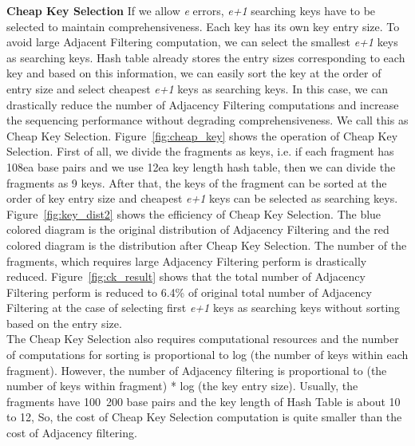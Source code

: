 \textbf{Cheap Key Selection} If we allow \textit{e} errors, \textit{e+1}
searching keys have to be selected to maintain comprehensiveness. Each key has
its own key entry size. To avoid large Adjacent Filtering computation, we can
select the smallest \textit{e+1} keys as searching keys. Hash table already
stores the entry sizes corresponding to each key and based on this information,
we can easily sort the key at the order of entry size and select cheapest
\textit{e+1} keys as searching keys. In this case, we can drastically reduce
the number of Adjacency Filtering computations and increase the sequencing
performance without degrading comprehensiveness. We call this as Cheap Key
Selection. Figure~\ref{fig:cheap_key} shows the operation of Cheap Key
Selection.  First of all, we divide the fragments as keys, i.e. if each
fragment has 108ea base pairs and we use 12ea key length hash table, then we
can divide the fragments as 9 keys. After that, the keys of the fragment can be
sorted at the order of key entry size and cheapest \textit{e+1} keys can be
selected as searching keys. Figure~\ref{fig:key_dist2} shows the efficiency of
Cheap Key Selection. The blue colored diagram is the original distribution of
Adjacency Filtering and the red colored diagram is the distribution after Cheap
Key Selection. The number of the fragments, which requires large Adjacency
Filtering perform is drastically reduced.  Figure~\ref{fig:ck_result} shows
that the total number of Adjacency Filtering perform is reduced to 6.4\% of
original total number of Adjacency Filtering at the case of selecting first
\textit{e+1} keys as searching keys without sorting based on the entry size. \\
The Cheap Key Selection also requires computational resources and the number of
computations for sorting is proportional to log (the number of keys within each
fragment).  However, the number of Adjacency filtering is proportional to (the
number of keys within fragment) * log (the key entry size).  Usually, the
fragments have 100~200 base pairs and the key length of Hash Table is about 10
to 12, So, the cost of Cheap Key Selection computation is quite smaller than
the cost of Adjacency filtering. \\

